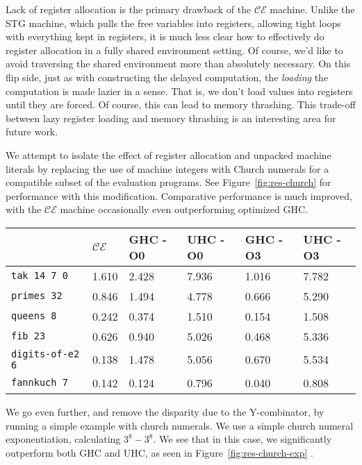 Lack of register allocation is the primary drawback of the $\mathcal{CE}$
machine. Unlike the STG machine, which pulls the free variables into registers,
allowing tight loops with everything kept in registers, it is much less clear
how to effectively do register allocation in a fully shared environment setting.
Of course, we'd like to avoid traversing the shared environment more than
absolutely necessary. On this flip side, just as with constructing the delayed
computation, the \emph{loading} the computation is made lazier in a sense. That
is, we don't load values into registers until they are forced. Of course, this
can lead to memory thrashing. This trade-off between lazy register loading and 
memory thrashing is an interesting area for future work.

We attempt to isolate the effect of register allocation and unpacked machine
literals by replacing the use of machine integers with Church numerals for a
compatible subset of the evaluation programs. See Figure~\ref{fig:res-church}
for performance with this modification. Comparative performance is much
improved, with the $\mathcal{CE}$ machine occasionally even outperforming
optimized GHC.

\begin{figure*}
\centering
\begin{tabularx}{\textwidth}{l | X | X | X | X | X}
& $\mathcal{CE}$ & GHC -O0 & UHC -O0 & GHC -O3 & UHC -O3 \\
\hline
\texttt{tak 14 7 0} & 1.610 & 2.428 & 7.936 & 1.016 & 7.782 \\
\texttt{primes 32} & 0.846 & 1.494 & 4.778 & 0.666 & 5.290 \\
\texttt{queens 8} & 0.242 & 0.374 & 1.510 & 0.154 & 1.508 \\
\texttt{fib 23} & 0.626 & 0.940 & 5.026 & 0.468 & 5.336 \\
\texttt{digits-of-e2 6} & 0.138 & 1.478 & 5.056 & 0.670 & 5.534 \\
\texttt{fannkuch 7} & 0.142 & 0.124 & 0.796 & 0.040 & 0.808 \\
\end{tabularx}
\caption{Church Numeral Benchmark Results. Measurement is wall clock time, 
units are seconds. Times averaged over 5 runs.}
\label{fig:res-church}
\end{figure*}

We go even further, and remove the disparity due to the Y-combinator, by
running a simple example with church numerals. We use a simple church
numeral exponentiation, calculating $3^8 - 3^8$. We see that in this case, we
significantly outperform both GHC and UHC, as seen in
Figure~\ref{fig:res-church-exp} .

